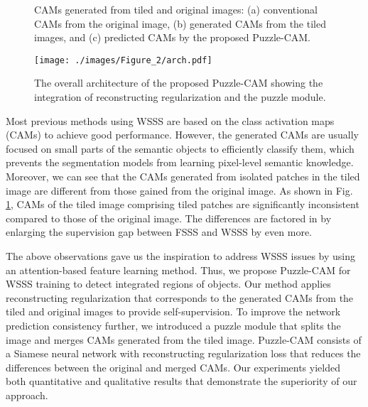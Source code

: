 \documentclass{article}
\begin{document}
\begin{figure}[t]
\centering
{}  \hspace{2mm}
 \hspace{2mm}
\caption{
CAMs generated from tiled and original images:
(a) conventional CAMs from the original image, (b) generated CAMs from the tiled images, and (c) predicted CAMs by the proposed Puzzle-CAM.
}
\label{fig:intro}
\vspace{-4mm}
\end{figure}


\begin{figure*}[t]\centering \texttt{[image: ./images/Figure\_2/arch.pdf]}
\caption{
The overall architecture of the proposed Puzzle-CAM showing the integration of reconstructing regularization and the puzzle module.
}
\vspace{-4mm}
\label{fig:full}
\end{figure*}

Most previous methods \cite{ahn2018learning, Wang_2020_CVPR, lee2019ficklenet} using WSSS are based on the class activation maps (CAMs) \cite{zhou2016learning} to achieve good performance.
However, the generated CAMs are usually focused on small parts of the semantic objects to efficiently classify them, which prevents the segmentation models from learning pixel-level semantic knowledge.
Moreover, we can see that the CAMs generated from isolated patches in the tiled image are different from those gained from the original image.
As shown in Fig. \ref{fig:intro}, CAMs of the tiled image comprising tiled patches are significantly inconsistent compared to those of the original image.
The differences are factored in by enlarging the supervision gap between FSSS and WSSS by even more.



The above observations gave us the inspiration to address WSSS issues by using an attention-based feature learning method.
Thus, we propose Puzzle-CAM for WSSS training to detect integrated regions of objects.
Our method applies reconstructing regularization that corresponds to the generated CAMs from the tiled and original images to provide self-supervision.
To improve the network prediction consistency further, we introduced a puzzle module that splits the image and merges CAMs generated from the tiled image.
Puzzle-CAM consists of a Siamese neural network with reconstructing regularization loss that reduces the differences between the original and merged CAMs.
Our experiments yielded both quantitative and qualitative results that demonstrate the superiority of our approach. 
\end{document}
